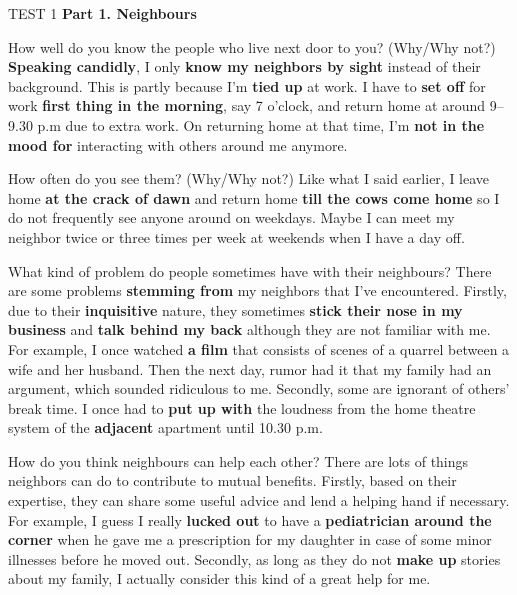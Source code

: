 \begin{glossarymc}[Cambridge 8]
    \begin{test}{TEST 1}
    \noindent
    \textbf{Part 1. Neighbours}
    \begin{qa}{How well do you know the people who live next door to you? (Why/Why not?)}
    \textbf{Speaking candidly}, I only \textbf{know my neighbors by sight} instead of their background. This is partly because I’m \textbf{tied up} at work. I have to \textbf{set off} for work \textbf{first thing in the morning}, say 7 o’clock, and return home at around 9–9.30 p.m due to extra work. On returning home at that time, I’m \textbf{not in the mood for} interacting with others around me anymore.
    \end{qa}

    \begin{qa}{How often do you see them? (Why/Why not?)}
    Like what I said earlier, I leave home \textbf{at the crack of dawn} and return home \textbf{till the cows come home} so I do not frequently see anyone around on weekdays. Maybe I can meet my neighbor twice or three times per week at weekends when I have a day off.
    \end{qa}

    \begin{qa}{What kind of problem do people sometimes have with their neighbours?}
    There are some problems \textbf{stemming from} my neighbors that I’ve encountered. Firstly, due to their \textbf{inquisitive} nature, they sometimes \textbf{stick their nose in my business} and \textbf{talk behind my back} although they are not familiar with me. For example, I once watched \textbf{a film} that consists of scenes of a quarrel between a wife and her husband. Then the next day, rumor had it that my family had an argument, which sounded ridiculous to me. Secondly, some are ignorant of others’ break time. I once had to \textbf{put up with} the loudness from the home theatre system of the \textbf{adjacent} apartment until 10.30 p.m.
    \end{qa}

    \begin{qa}{How do you think neighbours can help each other?}
    There are lots of things neighbors can do to contribute to mutual benefits. Firstly, based on their expertise, they can share some useful advice and lend a helping hand if necessary. For example, I guess I really \textbf{lucked out} to have a \textbf{pediatrician around the corner} when he gave me a prescription for my daughter in case of some minor illnesses before he moved out. Secondly, as long as they do not \textbf{make up} stories about my family, I actually consider this kind of a great help for me.
    \end{qa}


\end{test}
\end{glossarymc}
